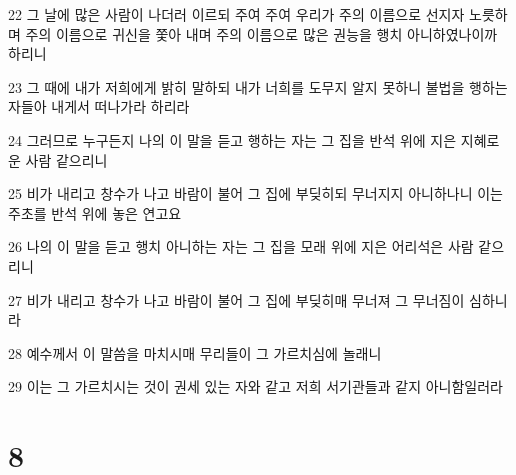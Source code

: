 \par 22 그 날에 많은 사람이 나더러 이르되 주여 주여 우리가 주의 이름으로 선지자 노릇하며 주의 이름으로 귀신을 쫓아 내며 주의 이름으로 많은 권능을 행치 아니하였나이까 하리니
\par 23 그 때에 내가 저희에게 밝히 말하되 내가 너희를 도무지 알지 못하니 불법을 행하는 자들아 내게서 떠나가라 하리라
\par 24 그러므로 누구든지 나의 이 말을 듣고 행하는 자는 그 집을 반석 위에 지은 지혜로운 사람 같으리니
\par 25 비가 내리고 창수가 나고 바람이 불어 그 집에 부딪히되 무너지지 아니하나니 이는 주초를 반석 위에 놓은 연고요
\par 26 나의 이 말을 듣고 행치 아니하는 자는 그 집을 모래 위에 지은 어리석은 사람 같으리니
\par 27 비가 내리고 창수가 나고 바람이 불어 그 집에 부딪히매 무너져 그 무너짐이 심하니라
\par 28 예수께서 이 말씀을 마치시매 무리들이 그 가르치심에 놀래니
\par 29 이는 그 가르치시는 것이 권세 있는 자와 같고 저희 서기관들과 같지 아니함일러라

\chapter{8}

